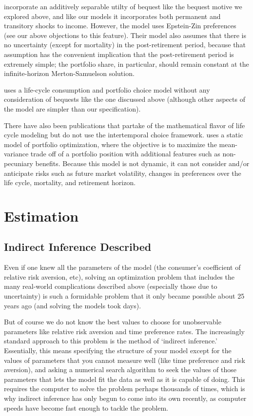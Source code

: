 \documentclass{article}
\begin{document}
\cite{O_Hara_2015} incorporate an additively separable utilty of bequest like the bequest motive we explored above, and like our models it incorporates both permanent and transitory shocks to income.
However, the model uses Epstein-Zin preferences (see our above objections to this feature).
Their model also assumes that there is no uncertainty (except for mortality) in the post-retirement period, because that assumption has the convenient implication that the post-retirement period is extremely simple; the portfolio share, in particular, should remain constant at the infinite-horizon Merton-Samuelson solution.

\cite{Lanski_2022} uses a life-cycle consumption and portfolio choice model without any consideration of bequests like the one discussed above (although other aspects of the model are simpler than our specification).

There have also been publications that partake of the mathematical flavor of life cycle modeling but do not use the intertemporal choice framework.
\cite{Idzorek_2023} uses a static model of portfolio optimization, where the objective is to maximize the mean-variance trade off of a portfolio position with additional features such as non-pecuniary benefits.
Because this model is not dynamic, it can not consider and/or anticipate risks such as future market volatility, changes in preferences over the life cycle, mortality, and retirement horizon.

\section{Estimation}

\subsection{Indirect Inference Described}

Even if one knew all the parameters of the model (the consumer's coefficient of relative risk aversion, etc), solving an optimization problem that includes the many real-world complications described above (especially those due to uncertainty) is such a formidable problem that it only became possible about 25 years ago (and solving the models took days).

But of course we do not know the best values to choose for unobservable parameters like relative risk aversion and time preference rates.
The increasingly standard approach to this problem is the method of `indirect inference.'
Essentially, this means specifying the structure of your model except for the values of parameters that you cannot measure well (like time preference and risk aversion), and asking a numerical search algorithm to seek the values of those parameters that lets the model fit the data as well as it is capable of doing.
This requires the computer to solve the problem perhaps thousands of times, which is why indirect inference has only begun to come into its own recently, as computer speeds have become fast enough to tackle the problem.
\end{document}
